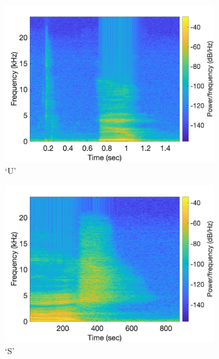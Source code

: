 \documentclass[11pt, oneside]{article}   	%
\begin{document}
\begin{figure}[ht]
\centering
\begin{subfigure}[b]{0.3\textwidth}
\includegraphics[width=\textwidth]{imgs/u.jpg}
\caption{`U'}
\end{subfigure}
\begin{subfigure}[b]{0.3\textwidth}
\includegraphics[width=\textwidth]{imgs/s.jpg}
\caption{`S'}
\end{subfigure}
\begin{subfigure}[b]{0.3\textwidth}

\end{subfigure}
\end{figure}
\end{document}
